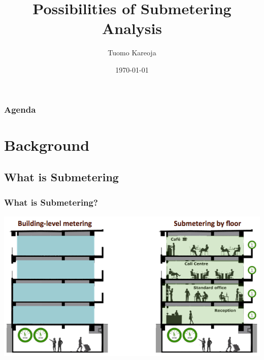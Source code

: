 \documentclass[10pt]{beamer}
\title[Data Science in Blackwell]{Possibilities of Submetering Analysis} %
\author{Tuomo Kareoja} %
\institute[IOT Analytics] %
{
IOT Analytics \\ %
\medskip
}
\date{\today} %
\begin{document}
\begin{frame}
\titlepage %
\end{frame}

\begin{frame}
\frametitle{Agenda} %
\tableofcontents %
\end{frame}


\section{Background}

\subsection{What is Submetering}

\begin{frame}
\frametitle{What is Submetering?}

\bigskip
{
    \centering
    \includegraphics[width=\textwidth,height=\textheight,keepaspectratio]{submetering.png}
    \par
}
\bigskip

\end{frame}
\end{document}
